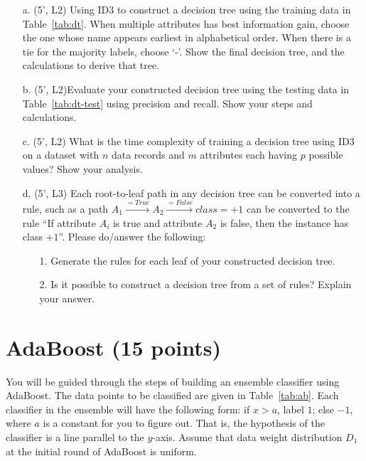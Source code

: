 \begin{itemize}
    \item[a.] (5', L2) Using ID3 to construct a decision tree using the training data in Table~\ref{tab:dt}. When multiple attributes has best information gain, choose the one whose name appears earliest in alphabetical order. When there is a tie for the majority labels, choose `-'. Show the final decision tree, and the calculations to derive that tree.
    
    \item[b.] (5', L2)Evaluate your constructed decision tree using the testing data in Table~\ref{tab:dt-test} using precision and recall. Show your steps and calculations.
    \item[c.] (5', L2) What is the time complexity of training a decision tree using ID3 on a dataset with $n$ data records and $m$ attributes each having $p$ possible values? Show your analysis.
    \item[d.] (5', L3) Each root-to-leaf path in any decision tree can be converted into a rule, such as a path $A_1\xrightarrow{=True}A_2\xrightarrow{=False} class=+1$ can be converted to the rule ``If attribute $A_i$ is true and attribute $A_2$ is false, then the instance has class $+1$''. Please do/answer the following:
        \begin{itemize}
            \item[1.] Generate the rules for each leaf of your constructed decision tree.
            \item[2.] Is it possible to construct a decision tree from a set of rules? Explain your answer.
        \end{itemize} 
\end{itemize}


\section{AdaBoost (15 points)}
You will be guided through the steps of building an ensemble classifier using AdaBoost. The data points to be classified are given in Table~\ref{tab:ab}. Each classifier in the ensemble will have the following form: if $x>a$, label $1$; else $-1$, where $a$ is a constant for you to figure out. That is, the hypothesis of the classifier is a line parallel to the $y$-axis. Assume that data weight distribution $D_1$ at the initial round of AdaBoost is uniform.\\

